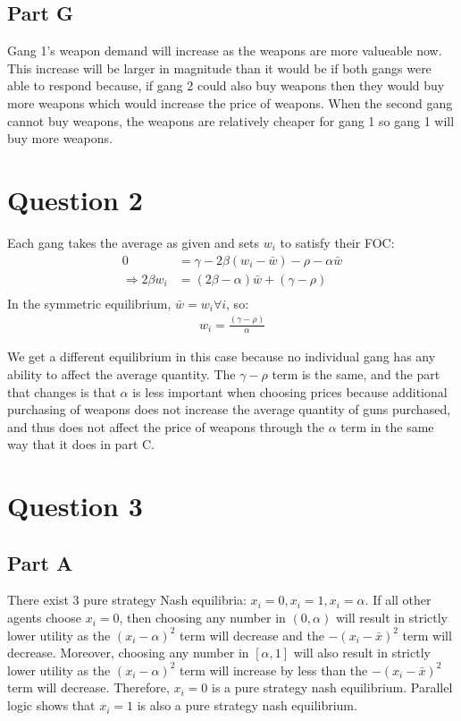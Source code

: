 \documentclass[11pt]{article} %
\begin{document}
\subsection{Part G}
Gang 1's weapon demand will increase as the weapons are more valueable now. This increase will be larger in magnitude than it would be if both gangs were able to respond because, if gang 2 could also buy weapons then they would buy more weapons which would increase the price of weapons. When the second gang cannot buy weapons, the weapons are relatively cheaper for gang 1 so gang 1 will buy more weapons.
\section{Question 2}
Each gang takes the average as given and sets $w_i$ to satisfy their FOC:
\begin{align*}
0&=\gamma - 2\beta (w_i - \bar{w}) - \rho - \alpha \bar{w}\\
\Rightarrow 2\beta w_i &= ( 2\beta - \alpha)\bar{w} + (\gamma - \rho)\\
\end{align*}
In the symmetric equilibrium, $\bar{w} = w_i \forall i$, so:
\begin{align*}
 w_i = \frac{(\gamma - \rho)}{\alpha}
\end{align*}

We get a different equilibrium in this case because no individual gang has any ability to affect the average quantity. The $\gamma - \rho$ term is the same, and the part that changes is that $\alpha$ is less important when choosing prices because additional purchasing of weapons does not increase the average quantity of guns purchased, and thus does not affect the price of weapons through the $\alpha$ term in the same way that it does in part C.

\section{Question 3} 
\subsection{Part A}
%
There exist 3 pure strategy Nash equilibria: $x_i=0,x_i=1,x_i = \alpha.$ If all other agents choose $x_i=0$, then choosing any number in $(0,\alpha)$ will result in strictly lower utility as the $(x_i - \alpha)^2$ term will decrease and the $-(x_i - \bar{x})^2$ term will decrease. Moreover, choosing any number in $[\alpha,1]$ will also result in strictly lower utility as the $(x_i - \alpha)^2$ term will increase by less than the $-(x_i - \bar{x})^2$ term will decrease. Therefore, $x_i = 0$ is a pure strategy nash equilibrium. Parallel logic shows that $x_i=1$ is also a pure strategy nash equilibrium.
\end{document}
